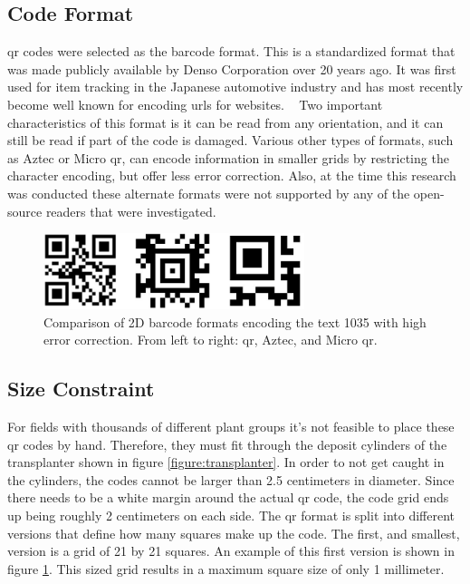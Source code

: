 \subsection{Code Format}
\label{section:code_format}

\acf{qr} codes were selected as the barcode format. This is a standardized format that was made publicly available by Denso Corporation over 20 years ago.  It was first used for item tracking in the Japanese automotive industry and has most recently become well known for encoding \acp{url} for websites. ~\citep{Denso:2014} Two important characteristics of this format is it can be read from any orientation, and it can still be read if part of the code is damaged.  Various other types of formats, such as Aztec or Micro \ac{qr}, can encode information in smaller grids by restricting the character encoding, but offer less error correction.  Also, at the time this research was conducted these alternate formats were not supported by any of the open-source readers that were investigated. 

\begin{figure}
	\centering
    \includegraphics[width=3in]{figures/generated_codes_1035.jpg}
    \caption[2D barcode formats]{Comparison of 2D barcode formats encoding the text 1035 with high error correction.  From left to right: \acf{qr}, Aztec, and Micro \ac{qr}.}
    \label{barcode_formats}
\end{figure} 

\subsection{Size Constraint}

For fields with thousands of different plant groups it's not feasible to place these \ac{qr} codes by hand.  Therefore, they must fit through the deposit cylinders of the transplanter shown in figure \ref{figure:transplanter}.  In order to not get caught in the cylinders, the codes cannot be larger than 2.5 centimeters in diameter. Since there needs to be a white margin around the actual \ac{qr} code, the code grid ends up being roughly 2 centimeters on each side.  The \ac{qr} format is split into different versions that define how many squares make up the code.  The first, and smallest, version is a grid of 21 by 21 squares.  An example of this first version is shown in figure \ref{barcode_formats}.  This sized grid results in a maximum square size of only 1 millimeter.  

